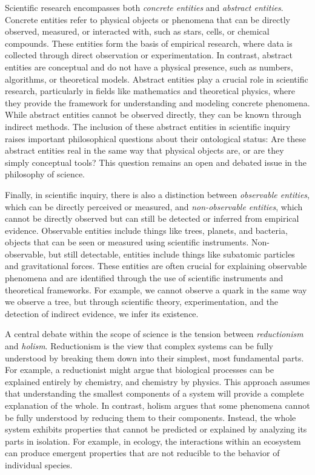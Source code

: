 Scientific research encompasses both \emph{concrete entities} and \emph{abstract entities}. Concrete entities refer to physical objects or phenomena that can be directly observed, measured, or interacted with, such as stars, cells, or chemical compounds. These entities form the basis of empirical research, where data is collected through direct observation or experimentation. In contrast, abstract entities are conceptual and do not have a physical presence, such as numbers, algorithms, or theoretical models. Abstract entities play a crucial role in scientific research, particularly in fields like mathematics and theoretical physics, where they provide the framework for understanding and modeling concrete phenomena. While abstract entities cannot be observed directly, they can be known through indirect methods. The inclusion of these abstract entities in scientific inquiry raises important philosophical questions about their ontological status: Are these abstract entities real in the same way that physical objects are, or are they simply conceptual tools? This question remains an open and debated issue in the philosophy of science.

Finally, in scientific inquiry, there is also a distinction between \emph{observable entities}, which can be directly perceived or measured, and \emph{non-observable entities}, which cannot be directly observed but can still be detected or inferred from empirical evidence. Observable entities include things like trees, planets, and bacteria, objects that can be seen or measured using scientific instruments. Non-observable, but still detectable, entities include things like subatomic particles and gravitational forces. These entities are often crucial for explaining observable phenomena and are identified through the use of scientific instruments and theoretical frameworks. For example, we cannot observe a quark in the same way we observe a tree, but through scientific theory, experimentation, and the detection of indirect evidence, we infer its existence.

A central debate within the scope of science is the tension between \emph{reductionism} and \emph{holism}. Reductionism is the view that complex systems can be fully understood by breaking them down into their simplest, most fundamental parts. For example, a reductionist might argue that biological processes can be explained entirely by chemistry, and chemistry by physics. This approach assumes that understanding the smallest components of a system will provide a complete explanation of the whole. In contrast, holism argues that some phenomena cannot be fully understood by reducing them to their components. Instead, the whole system exhibits properties that cannot be predicted or explained by analyzing its parts in isolation. For example, in ecology, the interactions within an ecosystem can produce emergent properties that are not reducible to the behavior of individual species.

